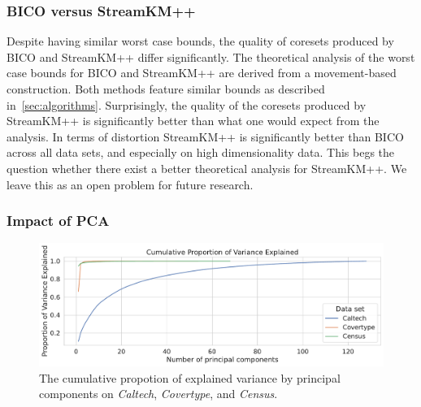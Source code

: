 \subsubsection*{BICO versus StreamKM++}
Despite having similar worst case bounds, the quality of coresets produced by BICO and StreamKM++ differ significantly.
The theoretical analysis of the worst case bounds for BICO and StreamKM++ are derived from a movement-based construction. Both methods feature similar bounds as described in~\cref{sec:algorithms}. Surprisingly, the quality of the coresets produced by StreamKM++ is significantly better than what one would expect from the analysis. In terms of distortion StreamKM++ is significantly better than BICO across all data sets, and especially on high dimensionality data. This begs the question whether there exist a better theoretical analysis for StreamKM++. We leave this as an open problem for future research.



\subsubsection*{Impact of PCA}

\begin{figure}
  \caption{The cumulative propotion of explained variance by principal components on \textit{Caltech}, \textit{Covertype}, and \textit{Census}.}
  \label{fig:explained-variance-pca}
  \includegraphics[width=0.9\linewidth]{figures/explained-variance-plot.pdf}
\end{figure}

